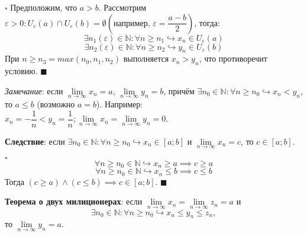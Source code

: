\documentclass[12pt, a4paper, reqno]{article}
\begin{document}
    $\square$ Предположим, что $a > b$. Рассмотрим $\varepsilon > 0: U_{\varepsilon}(a)\cap
    U_{\varepsilon}(b) = \emptyset \left(\text{например, }\varepsilon = \dfrac{a - b}{2}\right)$,
    тогда:
    \begin{equation*}
        \exists n_1(\varepsilon)\in\mathbb{N}: \forall n\geq n_1 \hookrightarrow x_n\in
        U_{\varepsilon}(a)
    \end{equation*}
    \begin{equation*}
        \exists n_2(\varepsilon)\in\mathbb{N}: \forall n\geq n_2 \hookrightarrow y_n\in
        U_{\varepsilon}(b)
    \end{equation*}
    При $n \geq n_3 = max(n_0, n_1, n_2)$ выполняется $x_n > y_n$, что противоречит условию.
    $\blacksquare$

    \textit{Замечание}: если $\lim\limits_{n\to\infty} x_n = a$, $\lim\limits_{n\to\infty} y_n = b$,
    причём $\exists n_0\in\mathbb{N}: \forall n \geq n_0 \hookrightarrow x_n < y_n$, то $a \leq b$
    (возможно $a = b$). Например: $x_n = -\dfrac{1}{n} < y_n = \dfrac{1}{n}; \lim\limits_{n\to\infty}
    x_n = \lim\limits_{n\to\infty} y_n = 0$.

    \textbf{Следствие}: если $\exists n_0\in\mathbb{N}: \forall n \geq n_0 \hookrightarrow x_n \in
    [a; b]$ и $\lim\limits_{n\to\infty} x_n = c$, то $c \in [a; b]$.

    $\square$
    \begin{equation*}
        \forall n \geq n_0\in\mathbb{N} \hookrightarrow x_n \geq a \implies c \geq a
    \end{equation*}
    \begin{equation*}
        \forall n \geq n_0\in\mathbb{N} \hookrightarrow x_n \leq b \implies c \leq b
    \end{equation*}
    Тогда $(c \geq a) \wedge (c \leq b) \implies c \in [a; b].$ $\blacksquare$

    \textbf{Теорема о двух милиционерах}: если $\lim\limits_{n\to\infty} x_n =
    \lim\limits_{n\to\infty} z_n = a$ и
    \begin{equation*}
        \exists n_0\in\mathbb{N}: \forall n \geq n_0 \hookrightarrow x_n \leq y_n \leq z_n,
    \end{equation*}
    то $\lim\limits_{n\to\infty} y_n = a$.
\end{document}
